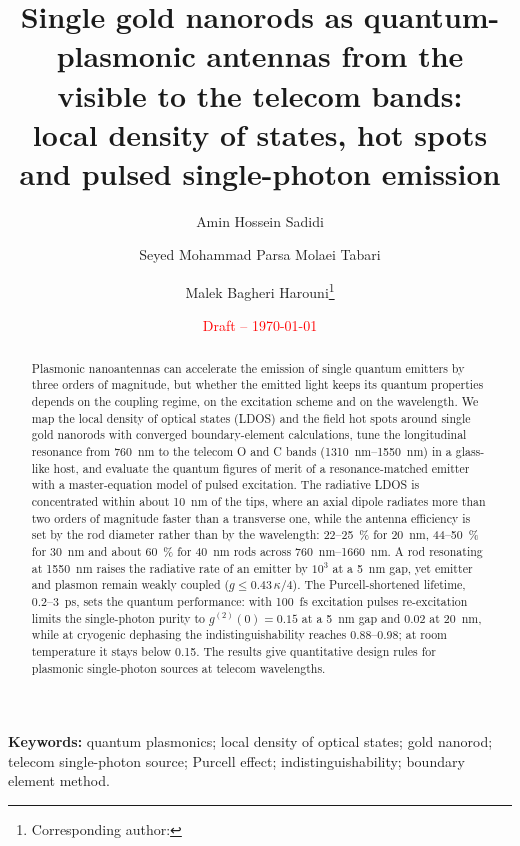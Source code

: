 \documentclass[11pt,a4paper]{article}
\title{Single gold nanorods as quantum-plasmonic antennas from the visible to the telecom bands:\\
local density of states, hot spots and pulsed single-photon emission}
\author[1]{Amin Hossein Sadidi}
\author[1]{Seyed Mohammad Parsa Molaei Tabari}
\author[1]{Malek Bagheri Harouni\thanks{Corresponding author: \TBD{e-mail}}}
\affil[1]{Department of Physics, Faculty of Science, University of Isfahan, Isfahan, Iran}
\date{\textcolor{red}{Draft -- \today}}
\begin{document}
\maketitle

\begin{abstract}
Plasmonic nanoantennas can accelerate the emission of single quantum emitters by three orders of magnitude, but
whether the emitted light keeps its quantum properties depends on the coupling regime, on the excitation scheme and
on the wavelength. We map the local density of optical states (LDOS) and the field hot spots around single gold
nanorods with converged boundary-element calculations, tune the longitudinal resonance from \SI{760}{nm} to the
telecom O and C bands (\SIrange{1310}{1550}{nm}) in a glass-like host, and evaluate the quantum figures of merit of a
resonance-matched emitter with a master-equation model of pulsed excitation. The radiative LDOS is concentrated within
about \SI{10}{nm} of the tips, where an axial dipole radiates more than two orders of magnitude faster than a
transverse one, while the antenna
efficiency is set by the rod diameter rather than by the wavelength: 22--\SI{25}{\percent} for \SI{20}{nm},
44--\SI{50}{\percent} for \SI{30}{nm} and about \SI{60}{\percent} for \SI{40}{nm} rods across
\SIrange{760}{1660}{nm}. A rod resonating at \SI{1550}{nm} raises the radiative rate of an emitter by $10^3$ at a
\SI{5}{nm} gap, yet emitter and plasmon remain weakly coupled ($g\le0.43\,\kappa/4$). The Purcell-shortened lifetime,
0.2--\SI{3}{ps}, sets the quantum performance: with \SI{100}{fs} excitation pulses re-excitation limits the
single-photon purity to $g^{(2)}(0)=0.15$ at a \SI{5}{nm} gap and 0.02 at \SI{20}{nm}, while at cryogenic dephasing
the indistinguishability reaches 0.88--0.98; at room temperature it stays below 0.15. The results give quantitative
design rules for plasmonic single-photon sources at telecom wavelengths.
\end{abstract}

\noindent\textbf{Keywords:} quantum plasmonics; local density of optical states; gold nanorod; telecom single-photon
source; Purcell effect; indistinguishability; boundary element method.

\end{document}
